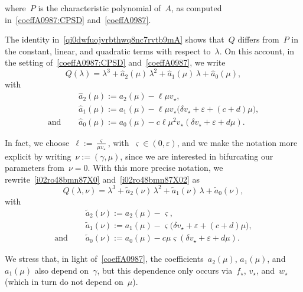 \documentclass[12pt]{amsart}
\renewcommand{\epsilon}{\varepsilon}
\numberwithin{equation}{section}
\begin{document}
where~$P$ is the characteristic polynomial of~$A$, as computed in~\eqref{coeffA0987:CPSD}
and~\eqref{coeffA0987}.

The identity in~\eqref{qi0dwfuojvrbthwq8nc7rvtb9mA} shows that~$Q$ differs from~$P$ in the constant, linear, and quadratic terms with
respect to~$\lambda$. On this account, in the setting of~\eqref{coeffA0987:CPSD}
and~\eqref{coeffA0987}, we write
\begin{equation}\label{i02ro48bmn87X0}
Q(\lambda)=\lambda^3+ \widehat{a}_2(\mu)\,\lambda^2+\widehat{a}_1(\mu)\,\lambda+\widehat{a}_0(\mu),\end{equation}
with
\begin{equation}\label{i02ro48bmn87X02}\begin{split}
&\widehat{a}_2(\mu):=a_2(\mu)-\ell\mu v_\star,\\
&\widehat{a}_1(\mu):=a_1(\mu)-\ell\mu v_\star \big( \delta v_\star + \epsilon + (c + d) \mu\big),\\
{\mbox{and }}\quad& \widehat{a}_0(\mu):=a_0(\mu)
-c\ell\mu^2 v_\star( \delta v_\star+ \epsilon + d \mu) .
\end{split}\end{equation}

In fact, we choose~$\ell:=\frac{\varsigma}{\mu v_\star}$, with~$\varsigma\in(0,\epsilon)$, and
we make the notation more explicit by writing~$\nu:=(\gamma,\mu)$, since we are interested
in bifurcating our parameters from~$\nu=0$. With this more precise notation, we rewrite~\eqref{i02ro48bmn87X0}
and~\eqref{i02ro48bmn87X02} as
\begin{equation}\label{i-dpbXJm0nXZ01}
Q(\lambda,\nu)=\lambda^3+ \widetilde{a}_2(\nu)\,\lambda^2+\widetilde{a}_1(\nu)\,\lambda+\widetilde{a}_0(\nu),\end{equation}
with
\begin{equation}\label{i-dpbXJm0nXZ0}\begin{split}
&\widetilde{a}_2(\nu):=a_2(\mu)-\varsigma,\\
&\widetilde{a}_1(\nu):=a_1(\mu)-\varsigma \big( \delta v_\star + \epsilon + (c + d) \mu\big),\\
{\mbox{and }}\quad& \widetilde{a}_0(\nu):=a_0(\mu)
-c\mu\varsigma( \delta v_\star+ \epsilon + d \mu) .
\end{split}\end{equation}

We stress that, in light of~\eqref{coeffA0987}, the coefficients~$a_2(\mu)$, $a_1(\mu)$, and~$a_1(\mu)$
also depend on~$\gamma$, but this dependence
only occurs via~$f_\star$, $v_\star$, and~$w_\star$ (which in turn do not depend on~$\mu$).
\end{document}

